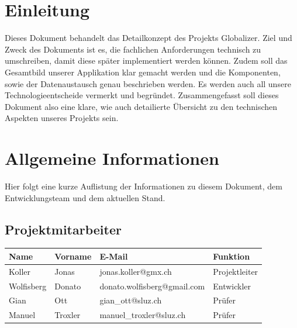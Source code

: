 \documentclass[12pt]{article}
\begin{document}
	\section{Einleitung}
	Dieses Dokument behandelt das Detailkonzept des Projekts Globalizer. Ziel und Zweck des Dokuments ist es, die fachlichen Anforderungen technisch zu umschreiben, damit diese später implementiert werden können. Zudem soll das Gesamtbild unserer Applikation klar gemacht werden und die Komponenten, sowie der Datenaustausch genau beschrieben werden. Es werden auch all unsere Technologieentscheide vermerkt und begründet. Zusammengefasst soll dieses Dokument also eine klare, wie auch detailierte Übersicht zu den technischen Aspekten unseres Projekts sein.
	
	\newpage
	
	\section{Allgemeine Informationen}
	Hier folgt eine kurze Auflistung der Informationen zu diesem Dokument, dem Ent\-wicklungsteam und dem aktuellen Stand.
	
	\subsection{Projektmitarbeiter}
	\begin{table}[h]
		\begin{tabularx}{\textwidth}{|l|l|X|l|}
			\hline
			\textbf{Name} & \textbf{Vorname}  & \textbf{E-Mail}                & \textbf{Funktion}     \\ \hline
			Koller        & Jonas             & jonas.koller@gmx.ch            & Projektleiter         \\ \hline
			Wolfisberg    & Donato            & donato.wolfisberg@gmail.com    & Entwickler            \\ \hline
			Gian          & Ott               & gian\_ott@sluz.ch              & Prüfer                \\ \hline
			Manuel        & Troxler           & manuel\_troxler@sluz.ch        & Prüfer                \\ \hline
		\end{tabularx}%
	\end{table}
	
\end{document}
